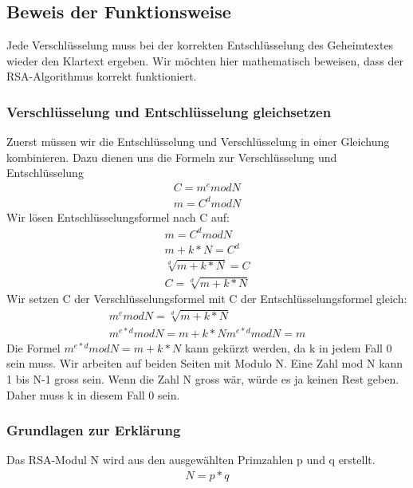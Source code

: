 \subsection{Beweis der Funktionsweise}
Jede Verschlüsselung muss bei der korrekten Entschlüsselung des Geheimtextes wieder den Klartext ergeben. Wir möchten hier mathematisch beweisen, dass der RSA-Algorithmus korrekt funktioniert.\\

\subsubsection{Verschlüsselung und Entschlüsselung gleichsetzen}
Zuerst müssen wir die Entschlüsselung und Verschlüsselung in einer Gleichung kombinieren. Dazu dienen uns die Formeln zur Verschlüsselung und Entschlüsselung\\

\begin{align}
  C = m^e mod N \\
  m = C^d mod N
\end{align}
Wir lösen Entschlüsselungsformel nach C auf:
\begin{align}
  m = C^d mod N \\
  m + k * N = C^d \\
  \sqrt[d]{m+k*N} = C \\
  C = \sqrt[d]{m+k*N}
\end{align}
Wir setzen C der Verschlüsselungsformel mit C der Entschlüsselungsformel gleich:
\begin{align}
  m^e mod N = \sqrt[d]{m+k*N}\\
  m^{e*d} mod N = m + k * N
  m^{e*d} mod N = m
\end{align}
Die Formel $ m^{e*d} mod N = m + k * N $ kann gekürzt werden, da k in jedem Fall 0 sein muss. Wir arbeiten auf beiden Seiten mit Modulo N. Eine Zahl mod N kann 1 bis N-1 gross sein.
Wenn die Zahl N gross wär, würde es ja keinen Rest geben. Daher muss k in diesem Fall 0 sein. 


\subsubsection{Grundlagen zur Erklärung}
Das RSA-Modul N wird aus den ausgewählten Primzahlen p und q erstellt.
\begin{align}
  N = p * q
\end{align}

